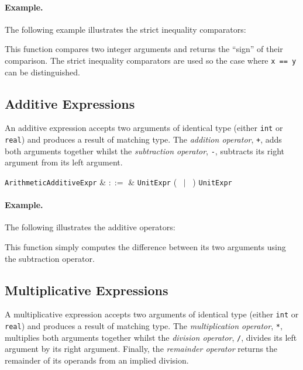\paragraph{Example.} The following example illustrates the strict inequality comparators:



This function compares two integer arguments and returns the ``sign'' of their comparison.  The strict inequality comparators are used so the case where \lstinline{x == y} can be distinguished.


\subsection{Additive Expressions}
\label{c_expr_additive}

An additive expression accepts two arguments of identical type (either \lstinline{int} or \lstinline{real}) and produces a result of matching type.  The {\em addition operator}, \lstinline{+}, adds both arguments together whilst the {\em subtraction operator}, \lstinline{-}, subtracts its right argument from its left argument.

\begin{syntax}
  \verb+ArithmeticAdditiveExpr+ & $::=$ & \verb+UnitExpr+ \big(\ \token{+} $|$ \token{-}\ \big) \verb+UnitExpr+\\
\end{syntax}

\paragraph{Example.}  The following illustrates the additive operators:



This function simply computes the difference between its two arguments using the subtraction operator.


\subsection{Multiplicative Expressions}
\label{c_expr_multiplicative}

A multiplicative expression accepts two arguments of identical type (either \lstinline{int} or \lstinline{real}) and produces a result of matching type.  The {\em multiplication operator}, \lstinline{*}, multiplies both arguments together whilst the {\em division operator}, \lstinline{/}, divides its left argument by its right argument.  Finally, the {\em remainder operator} returns the remainder of its operands from an implied division.  

